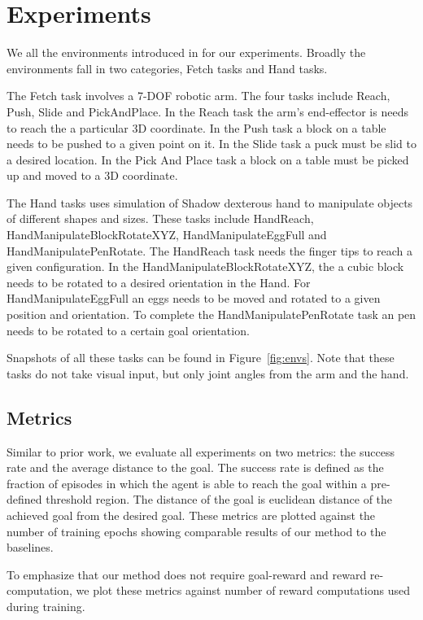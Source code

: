 \section{Experiments}
\label{sec:experiments}
We all the environments  introduced in \citet{plappert201802multigoalrl} for our experiments.
Broadly the environments fall in two categories, Fetch tasks and Hand tasks.

The Fetch task involves a 7-DOF robotic arm. The four tasks include Reach, Push,
Slide and PickAndPlace.
In the Reach task the arm's end-effector is needs to reach the a particular 3D coordinate. 
In the Push task a block on a table needs to be pushed to a given point on it.
In the Slide task a puck must be slid to a desired location.
In the Pick And Place task a block on a table must be picked up and moved to a
3D coordinate.

The Hand tasks uses simulation of Shadow dexterous hand to manipulate objects of
different shapes and sizes. These tasks include HandReach,
HandManipulateBlockRotateXYZ, HandManipulateEggFull and HandManipulatePenRotate.
The HandReach task needs the finger tips to reach a given configuration.
In the HandManipulateBlockRotateXYZ, the a cubic block needs to be rotated to a
desired orientation in the Hand.
For HandManipulateEggFull an eggs needs to be moved and rotated to a given
position and orientation.
To complete the HandManipulatePenRotate task an pen needs to be rotated to a
certain goal orientation.

Snapshots of all these tasks can be found in Figure~\ref{fig:envs}. Note that
these tasks do not take visual input, but only joint angles from the arm and the hand.


\subsection{Metrics}
Similar to prior work, we evaluate all experiments on two metrics: the success
rate and the average distance to the goal. The success rate is defined as the
fraction of episodes in which the agent is able to reach the goal within a
pre-defined threshold region.
The distance of the goal is euclidean distance of the
achieved goal from the desired goal.
These metrics are plotted against the number of training epochs showing
comparable results of our method to the baselines.

To emphasize that our method does not require goal-reward
and reward re-computation, we plot these metrics against
number of reward computations used during training.

